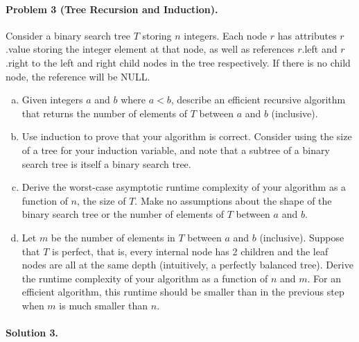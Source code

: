 \documentclass[11pt]{article}
\begin{document}
\paragraph{Problem 3 (Tree Recursion and Induction).}
Consider a binary search tree $T$ storing $n$ integers. Each node $r$ has
attributes $r$.value storing the integer element at that node, as well as 
references $r$.left and $r$.right to the left and right child nodes in the tree
respectively. If there is no child node, the reference will be NULL.
\begin{enumerate}[(a)]
    \item Given integers $a$ and $b$ where $a < b$, describe an efficient
        recursive algorithm that returns the number of elements of $T$ between
        $a$ and $b$ (inclusive).
    
    \item Use induction to prove that your algorithm is correct. Consider using
        the size of a tree for your induction variable, and note that a subtree
        of a binary search tree is itself a binary search tree.
    
    \item Derive the worst-case asymptotic runtime complexity of your algorithm
        as a function of $n$, the size of $T$. Make no assumptions about the
        shape of the binary search tree or the number of elements of $T$ between
        $a$ and $b$.
    
    \item Let $m$ be the number of elements in $T$ between $a$ and $b$
        (inclusive). Suppose that $T$ is perfect, that is, every internal node
        has 2 children and the leaf nodes are all at the same depth 
        (intuitively, a perfectly balanced tree). Derive the runtime complexity
        of your algorithm as a function of $n$ and $m$. For an efficient
        algorithm, this runtime should be smaller than in the previous step
        when $m$ is much smaller than $n$.
\end{enumerate}

\paragraph{Solution 3.}
\end{document}

